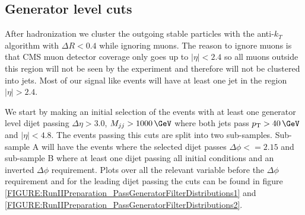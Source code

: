 \subsection{Generator level cuts}
\label{SUBSECTION:RunIIPreparation_GeneratorLevelCuts}


After hadronization we cluster the outgoing stable particles with the anti-$k_T$ algorithm with $\Delta R<0.4$ while ignoring muons. The reason to ignore muons is that \gls{CMS} muon detector coverage only goes up to $|\eta|<2.4$ so all muons outside this region will not be seen by the experiment and therefore will not be clustered into jets. Most of our signal like events will have at least one jet in the region $|\eta|>2.4$. 

We start by making an initial selection of the events with at least one generator level dijet passing $\Delta\eta > 3.0$, $M_{jj} > 1000\,\GeV$ where both jets pass $\pt > 40\,\GeV$ and $|\eta|<4.8$. The events passing this cuts are split into two sub-samples. Sub-sample A will have the events where the selected dijet passes $\Delta\phi<=2.15$ and sub-sample B where at least one dijet passing all initial conditions and an inverted $\Delta\phi$ requirement. Plots over all the relevant variable before the $\Delta\phi$ requirement and for the leading dijet passing the cuts can be found in figure \ref{FIGURE:RunIIPreparation_PassGeneratorFilterDistributions1} and \ref{FIGURE:RunIIPreparation_PassGeneratorFilterDistributions2}.

